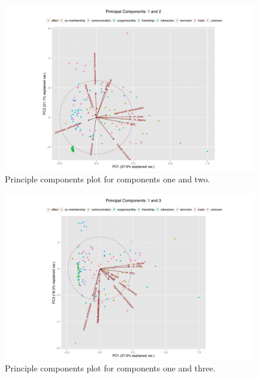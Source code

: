 \documentclass[3p,times]{elsarticle}
\begin{document}
\begin{figure}
\begin{center}
	\caption{\label{fig:1 and 2} Principle components plot for components one and two.}
		\includegraphics[width = 0.98\textwidth]{./images/Observed_PCA_Components1_2.pdf}
\end{center}
\end{figure}

\begin{figure}
\begin{center}
	\caption{\label{fig:1 and 3} Principle components plot for components one and three.}
		\includegraphics[width = 0.98\textwidth]{./images/Observed_PCA_Components1_3.pdf}
\end{center}
\end{figure}
\end{document}
